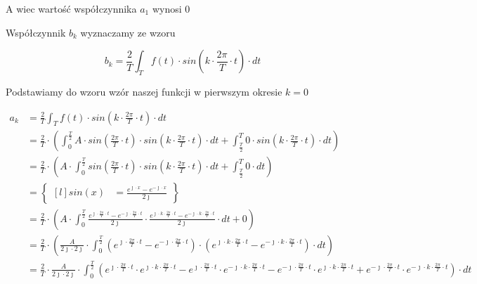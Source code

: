 A wiec wartość współczynnika $a_1$ wynosi $0$

Współczynnik $b_k$ wyznaczamy ze wzoru

\begin{equation}
b_k=\frac{2}{T}\int_{T}f(t) \cdot sin\left( k \cdot \frac{2\pi}{T} \cdot t\right) \cdot dt
\end{equation}

Podstawiamy do wzoru wzór naszej funkcji w pierwszym okresie $k=0$

\begin{align*}
a_k&=\frac{2}{T}\int_{T}f(t) \cdot sin\left( k \cdot \frac{2\pi}{T} \cdot t\right) \cdot dt\\
&=\frac{2}{T}\cdot\left(\int_{0}^{\frac{T}{2}}A \cdot sin\left( \frac{2\pi}{T} \cdot t\right) \cdot sin\left( k \cdot \frac{2\pi}{T} \cdot t\right) \cdot dt+\int_{\frac{T}{2}}^{T} 0 \cdot sin\left( k \cdot \frac{2\pi}{T} \cdot t\right) \cdot dt\right)\\
&=\frac{2}{T}\cdot\left(A \cdot \int_{0}^{\frac{T}{2}}sin\left( \frac{2\pi}{T} \cdot t\right) \cdot sin\left( k \cdot \frac{2\pi}{T} \cdot t\right) \cdot dt+\int_{\frac{T}{2}}^{T} 0 \cdot dt\right)\\
&=\begin{Bmatrix*}[l]
sin\left(x\right)&=\frac{e^{\jmath \cdot x}-e^{-\jmath \cdot x}}{2 \jmath }
\end{Bmatrix*}\\
&=\frac{2}{T}\cdot\left(A \cdot \int_{0}^{\frac{T}{2}} \frac{e^{\jmath \cdot \frac{2\pi}{T} \cdot t}-e^{-\jmath \cdot \frac{2\pi}{T} \cdot t}}{2\jmath} \cdot \frac{e^{\jmath \cdot k \cdot \frac{2\pi}{T} \cdot t}-e^{-\jmath \cdot k \cdot \frac{2\pi}{T} \cdot t}}{2\jmath} \cdot dt+0\right)\\
&=\frac{2}{T}\cdot\left(\frac{A}{2\jmath\cdot 2\jmath} \cdot \int_{0}^{\frac{T}{2}} \left(e^{\jmath \cdot \frac{2\pi}{T} \cdot t}-e^{-\jmath \cdot \frac{2\pi}{T} \cdot t}\right)\cdot \left(e^{\jmath \cdot k \cdot \frac{2\pi}{T} \cdot t}-e^{-\jmath \cdot k \cdot \frac{2\pi}{T} \cdot t}\right) \cdot dt\right)\\
&=\frac{2}{T} \cdot \frac{A}{2\jmath\cdot 2\jmath} \cdot \int_{0}^{\frac{T}{2}}
\left(e^{\jmath \cdot \frac{2\pi}{T} \cdot t} \cdot e^{\jmath \cdot k \cdot \frac{2\pi}{T} \cdot t} - e^{\jmath \cdot \frac{2\pi}{T} \cdot t} \cdot e^{-\jmath \cdot k \cdot \frac{2\pi}{T} \cdot t} - e^{-\jmath \cdot \frac{2\pi}{T} \cdot t} \cdot e^{\jmath \cdot k \cdot \frac{2\pi}{T} \cdot t} + e^{-\jmath \cdot \frac{2\pi}{T} \cdot t} \cdot e^{-\jmath \cdot k \cdot \frac{2\pi}{T} \cdot t} \right) \cdot dt\\

\end{align*}

